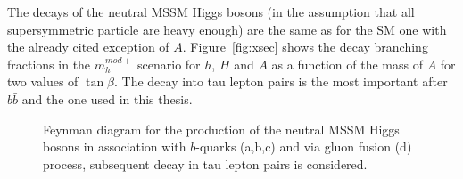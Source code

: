 The decays of the neutral
MSSM Higgs bosons (in the assumption that all supersymmetric particle
are heavy enough) are the same as for the SM one with the already
cited exception of $A$. Figure~\ref{fig:xsec} shows the decay branching fractions in the $m_h^{mod+}$ scenario
for $h$, $H$ and $A$ as a function of the mass of $A$ for two values of $\tan \beta$. The decay into tau lepton 
pairs is the most important after $b\bar{b}$ and the one used in this thesis. 

\begin{figure}[tp]
     \begin{center}
     \hspace{0.2cm}	
     	\hspace{0.2cm}	
     \end{center}
    \caption{Feynman diagram for the production of the neutral MSSM Higgs bosons in association with  $b$-quarks (a,b,c) and via gluon fusion (d) 
	process, subsequent decay in tau lepton pairs is considered.}
   \label{fig:prod}
\end{figure}


